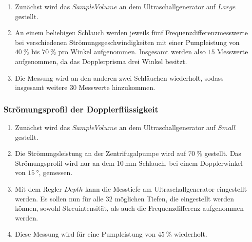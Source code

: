 \begin{enumerate}

  \item Zunächst wird das $Sample Volume$ an dem Ultraschallgenerator auf
  $Large$ gestellt.

  \item An einem beliebigen Schlauch werden jeweils fünf
  Frequenzdifferenzmesswerte bei verschiedenen
  Strömungsgeschwindigkeiten mit einer Pumpleistung von $\SI{40}{\percent}$ bis
  $\SI{70}{\percent}$ pro Winkel aufgenommen. Insgesamt werden also $15$
  Messwerte aufgenommen, da das Dopplerprisma drei Winkel besitzt.

  \item Die Messung wird an den anderen zwei Schläuchen wiederholt, sodass
  insgesamt weitere $30$ Messwerte hinzukommen.

\end{enumerate}

\subsubsection{Strömungsprofil der Dopplerflüssigkeit}

\begin{enumerate}

  \item Zunächst wird das $Sample Volume$ an dem Ultraschallgenerator auf
  $Small$ gestellt.

  \item Die Strömungsleistung an der Zentrifugalpumpe wird
  auf $\SI{70}{\percent}$ gestellt. Das Strömungsprofil wird nur an dem
  $\SI{10}{\milli\meter}$-Schlauch, bei einem Dopplerwinkel von
  $\SI{15}{\degree}$, gemessen.

  \item Mit dem Regler $Depth$ kann die Messtiefe am Ultraschallgenerator
  eingestellt werden. Es sollen nun für alle $32$ möglichen Tiefen, die
  eingestellt werden können, sowohl Streuintensität, als auch die
  Frequenzdifferenz aufgenommen werden.

  \item Diese Messung wird für eine Pumpleistung von $\SI{45}{\percent}$
  wiederholt.

\end{enumerate}
